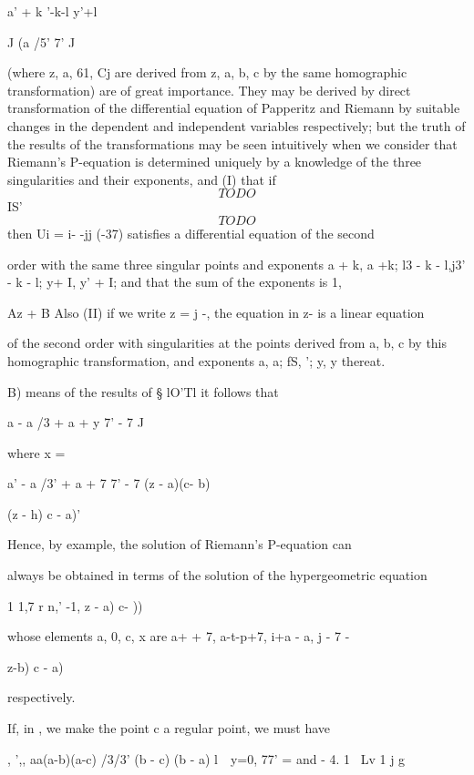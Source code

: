 a' + k '-k-l y'+l

J (a /5' 7' J

(where z, a, 61, Cj are derived from z, a, b, c by the same
homographic transformation) are of great importance. They may be
derived by direct transformation of the differential equation of
Papperitz and Riemann by suitable changes in the dependent and
independent variables respectively; but the truth of the results of
the transformations may be seen intuitively when we consider that
Riemann's P-equation is determined uniquely by a knowledge of the
three singularities and their exponents, and (I) that if
$$
TODO
$$
IS'
$$
TODO
$$
then Ui = i- -jj (-37) satisfies a differential equation of the second

order with the same three singular points and exponents a + k, a +k;
l3 - k - l,j3' - k - l; y+ I, y' + I; and that the sum of the
exponents is 1,

Az + B Also (II) if we write z = j -, the equation in z- is a linear
equation

of the second order with singularities at the points derived from a,
b, c by this homographic transformation, and exponents a, a; fS, ';
y, y thereat.

%
%


B) means of the results of § lO'Tl it follows that

 a - a /3 + a + y 7' - 7 J

where x =

a' - a /3' + a + 7 7' - 7 (z - a)(c- b)

(z - h) c - a)'

Hence, by  example, the solution of Riemann's P-equation can

always be obtained in terms of the solution of the hypergeometric
equation

1 1,7 r n,' -1, z - a) c- ))

whose elements a, 0, c, x are a+ + 7, a-t-p+7, i+a - a, j - 7 -

 z-b) c - a)

respectively.


If, in , we make the point c a regular point, we must have

, ',, aa(a-b)(a-c) /3/3' (b - c) (b - a) l\ \ y=0, 77' = and - 4. 1
\ Lv 1 j g

